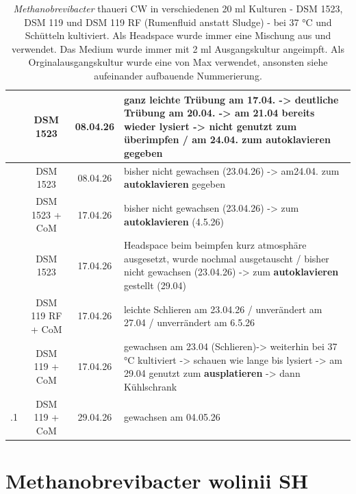 \documentclass[12pt,a4paper,draft]{report}
\newcommand{\RN}[1]{\uppercase\expandafter{\romannumeral#1}}
\begin{document}
\begin{table}[h]
\begin{tabularx}{\linewidth}{c  c  c  >{\centering\arraybackslash}X}
		 \RN{2} & DSM 1523 & 08.04.26 & ganz leichte Trübung am 17.04. -> deutliche Trübung am 20.04. -> am 21.04 bereits wieder lysiert -> nicht genutzt zum überimpfen / am 24.04. zum \textbf{autoklavieren} gegeben\\ \hline
		 
		 \RN{3} & DSM 1523 & 08.04.26 & bisher nicht gewachsen (23.04.26) -> am24.04. zum \textbf{autoklavieren} gegeben\\ \hline
		 
		 \RN{4} & DSM 1523 + CoM & 17.04.26 & bisher nicht gewachsen (23.04.26) -> zum \textbf{autoklavieren} (4.5.26)\\ \hline
		 
		 \RN{5} & DSM 1523 & 17.04.26 & Headspace beim beimpfen kurz atmosphäre ausgesetzt, wurde nochmal ausgetauscht / bisher nicht gewachsen (23.04.26) -> zum \textbf{autoklavieren} gestellt (29.04)\\ \hline
		 
		 \RN{6} & DSM 119 RF + CoM & 17.04.26 & leichte Schlieren am  23.04.26 / unverändert am 27.04 / unverrändert am 6.5.26\\ \hline
		 
		 \RN{7} & DSM 119 + CoM & 17.04.26 &  gewachsen am 23.04 (Schlieren)-> weiterhin bei 37 °C kultiviert -> schauen wie lange bis lysiert -> am 29.04 genutzt zum \textbf{ausplatieren} -> dann Kühlschrank \\
		 
		 \RN{7}.1 & DSM 119 + CoM & 29.04.26 & gewachsen am 04.05.26\\ 
		 
		 \bottomrule
			\end{tabularx}
			\caption{\textit{Methanobrevibacter} thaueri CW in verschiedenen 20 ml Kulturen - DSM 1523, DSM 119 und DSM 119 RF (Rumenfluid anstatt Sludge) - bei 37 °C und Schütteln kultiviert. Als Headspace wurde immer eine Mischung aus  und  verwendet. Das Medium wurde immer mit 2 ml Ausgangskultur angeimpft. Als Orginalausgangskultur wurde eine von Max verwendet, ansonsten siehe aufeinander aufbauende Nummerierung.}
			\label{Tab:Mthau}
\end{table}




\section{Methanobrevibacter wolinii SH}
\end{document}
